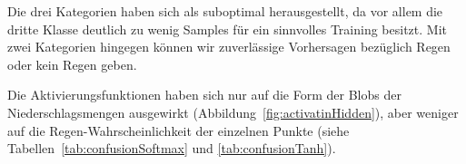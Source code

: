 Die drei Kategorien haben sich als suboptimal herausgestellt, da vor allem die dritte Klasse deutlich zu wenig Samples für ein sinnvolles Training besitzt. Mit zwei Kategorien hingegen können wir zuverlässige Vorhersagen bezüglich Regen oder kein Regen geben.

Die Aktivierungsfunktionen haben sich nur auf die Form der Blobs der Niederschlagsmengen ausgewirkt (Abbildung~\ref{fig:activatinHidden}), aber weniger auf die Regen-Wahrscheinlichkeit der einzelnen Punkte (siehe Tabellen~\ref{tab:confusionSoftmax} und \ref{tab:confusionTanh}).
